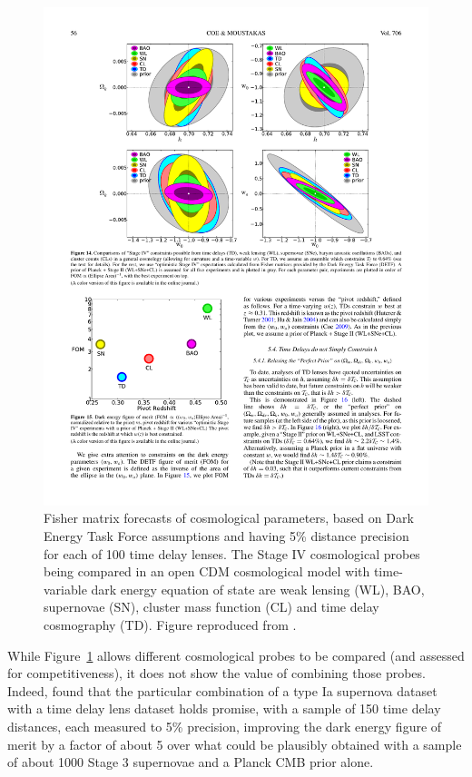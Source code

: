\begin{figure}[!ht]
\centering\includegraphics[width=0.9\linewidth]{figures/Coe+Moustakas09_fig14.pdf}
\caption{Fisher matrix forecasts of cosmological parameters, based on
Dark Energy Task Force assumptions and having 5\% distance precision
for each of 100 time delay lenses. The Stage IV cosmological probes
being compared in an  open CDM cosmological model with time-variable
dark energy equation of state are weak lensing (WL), BAO, supernovae
(SN), cluster mass function (CL) and time delay cosmography (TD).
Figure reproduced from \citet{C+M09b}.}
\label{fig:fisher}
\end{figure}



While Figure~\ref{fig:fisher} allows different cosmological probes to
be compared (and assessed for competitiveness), it does not show the
value of combining those probes. Indeed, \citet{Lin11} found that the
particular combination of a type Ia supernova dataset with a time  delay
lens dataset holds promise, with a sample of 150 time delay distances,
each measured to 5\% precision, improving the dark energy figure of
merit by a factor of about 5 over what could be  plausibly obtained with
a sample of about 1000 Stage 3 supernovae and a Planck CMB prior alone.


